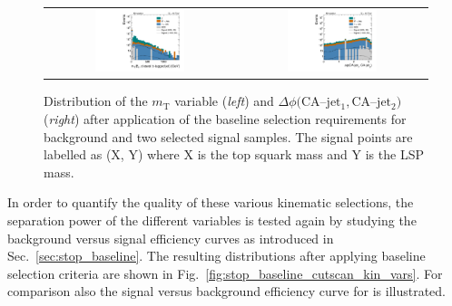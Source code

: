 \begin{figure}[!t]
  \centering
  \begin{tabular}{cc}
                \includegraphics[width=0.49\textwidth]{figures/Stop_DeltaPhiSelection_transverseMass_MET_closestAndBTaggedJet.pdf} &
                \includegraphics[width=0.49\textwidth]{figures/Stop_DeltaPhiSelection_deltaPhi_topjet1_topjet2.pdf}
  \end{tabular}
  \caption{Distribution of the $m_\mathrm{T}$ variable (\textit{left}) and $\Delta \phi(\mathrm{CA}$--$\mathrm{jet_1}, \mathrm{CA}$--$\mathrm{jet_2})$ (\textit{right}) after application of the baseline selection requirements for background and two selected signal samples. The signal points are labelled as (X, Y) where X is the top squark mass and Y is the LSP mass.}
  \label{fig:stop_baseline_kin_vars2}
\end{figure}
In order to quantify the quality of these various kinematic selections, the separation power of the different variables is tested again by studying the background versus signal efficiency curves as introduced in Sec.~\ref{sec:stop_baseline}. The resulting distributions after applying baseline selection criteria are shown in Fig.~\ref{fig:stop_baseline_cutscan_kin_vars}. For comparison also the signal versus background efficiency curve for \met is illustrated. \\
